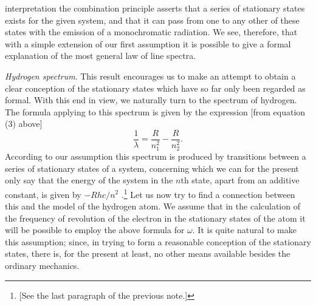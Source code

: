 interpretation the combination principle asserts that a series of
stationary states exists for the given system, and that it can pass from
one to any other of these states with the emission of a monochromatic
radiation. We see, therefore, that with a simple extension of our first
assumption it is possible to give a formal explanation of the most
general law of line spectra.

\emph{Hydrogen spectrum}. This result encourages us to make an attempt
to obtain a clear conception of the stationary states which have so far
only been regarded as formal. With this end in view, we naturally turn
to the spectrum of hydrogen. The formula applying to this spectrum is
given by the expression {[}from equation (3) above{]}
%
\begin{equation*}
\frac{1}{\lambda} = \frac{R}{n_1^2} - \frac{R}{n_2^2} .
\end{equation*}
%
According to our assumption this spectrum is produced by transitions
between a series of stationary states of a system, concerning which we
can for the present only say that the energy of the system in the
$n$th state, apart from an additive constant, is given by
$-Rhc/n^2$ .\footnote{{[}See the last paragraph of the previous
  note.{]}} Let us now try to find a connection between this and the
model of the hydrogen atom. We assume that in the calculation of the
frequency of revolution of the electron in the stationary states of the
atom it will be possible to employ the above formula for $\omega$. It is
quite natural to make this assumption; since, in trying to form a
reasonable conception of the stationary states, there is, for the
present at least, no other means available besides the ordinary
mechanics.

